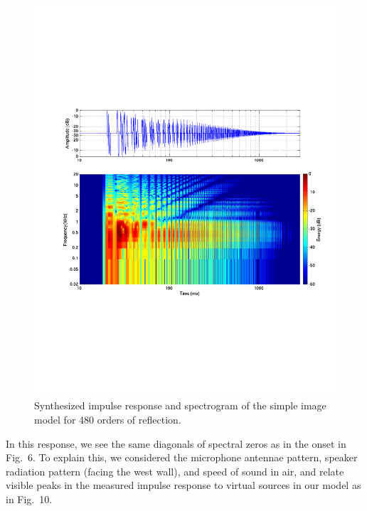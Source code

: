 \documentclass{aes137}
\begin{document}
\begin{figure}[h!] \centering \includegraphics[width=\linewidth]{images/IM_480c00_irsg_cropped.pdf} \caption{Synthesized impulse response and spectrogram of the simple image model for 480 orders of reflection.} \end{figure}

In this response, we see the same diagonals of spectral zeros as in the onset in Fig.~6. %
To explain this, we considered the microphone antennae pattern, speaker radiation pattern (facing the
west wall), and speed of sound in air, and relate visible peaks in
the measured impulse response to virtual sources in our model as in Fig.~10.
\end{document}
